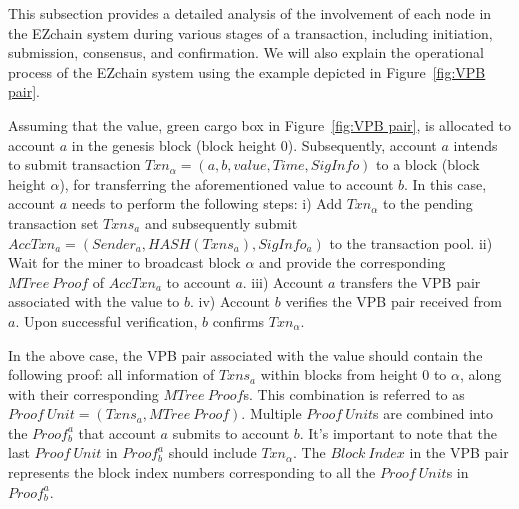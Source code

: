 \documentclass[conference]{IEEEtran}
\begin{document}
This subsection provides a detailed analysis of the involvement of each node in the EZchain system during various stages of a transaction, including initiation, submission, consensus, and confirmation. We will also explain the operational process of the EZchain system using the example depicted in Figure~\ref{fig:VPB pair}.

Assuming that the value, green cargo box in Figure~\ref{fig:VPB pair}, is allocated to account $a$ in the genesis block (block height $0$). Subsequently, account $a$ intends to submit transaction $Txn_{\alpha}=(a, b, value, Time, SigInfo)$ to a block (block height $\alpha$), for transferring the aforementioned value to account $b$. In this case, account $a$ needs to perform the following steps: i) Add $Txn_{\alpha}$ to the pending transaction set $Txns_a$ and subsequently submit $AccTxn_a=(Sender_a, HASH(Txns_a), SigInfo_a)$ to the transaction pool.
ii) Wait for the miner to broadcast block $\alpha$ and provide the corresponding $MTree~Proof$ of $AccTxn_a$ to account $a$.
iii) Account $a$ transfers the VPB pair associated with the value to $b$.
iv) Account $b$ verifies the VPB pair received from $a$. Upon successful verification, $b$ confirms $Txn_{\alpha}$.

In the above case, the VPB pair associated with the value should contain the following proof: all information of $Txns_a$ within blocks from height $0$ to $\alpha$, along with their corresponding $MTree~Proof$s. This combination is referred to as $Proof~Unit=(Txns_a, MTree~Proof)$. Multiple $Proof~Unit$s are combined into the $Proof^a_b$ that account $a$ submits to account $b$. It's important to note that the last $Proof~Unit$ in $Proof^a_b$ should include $Txn_{\alpha}$. The $Block~Index$ in the VPB pair represents the block index numbers corresponding to all the $Proof~Unit$s in $Proof^a_b$.
\end{document}
